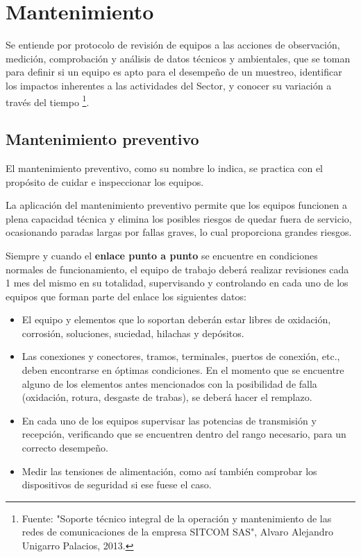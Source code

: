\documentclass[12pt,a4paper]{book}
\begin{document}
\section{Mantenimiento}
Se entiende por protocolo de revisión de equipos a las acciones de observación, medición, comprobación y análisis de datos técnicos y ambientales, que se toman para definir si un equipo es apto para el desempeño de un muestreo, identificar los impactos inherentes a las actividades del Sector, y conocer su variación a través del tiempo \footnote{\label{note1}Fuente: "Soporte técnico integral de la operación y mantenimiento de las redes de comunicaciones de la empresa SITCOM SAS", Alvaro Alejandro Unigarro Palacios, 2013.}.

\subsection{Mantenimiento preventivo}
El mantenimiento preventivo, como su nombre lo indica, se practica con el propósito de cuidar e inspeccionar los equipos. 

La aplicación del mantenimiento preventivo permite que los equipos funcionen a plena capacidad técnica y elimina los posibles riesgos de quedar fuera de servicio, ocasionando paradas largas por fallas graves, lo cual proporciona grandes riesgos.

Siempre y cuando el \textbf{enlace punto a punto} se encuentre en condiciones normales de funcionamiento, el equipo de trabajo deberá realizar revisiones cada 1 mes del mismo en su totalidad, supervisando y controlando en cada uno de los equipos que forman parte del enlace los siguientes datos:

\begin{itemize}
\item El equipo y elementos que lo soportan deberán estar libres de oxidación, corrosión, soluciones, suciedad, hilachas y depósitos.
\item Las conexiones y conectores, tramos, terminales, puertos de conexión, etc., deben encontrarse en óptimas condiciones. En el momento que se encuentre alguno de los elementos antes mencionados con la posibilidad de falla (oxidación, rotura, desgaste de trabas), se deberá hacer el remplazo.
\item En cada uno de los equipos supervisar las potencias de transmisión y recepción, verificando que se encuentren dentro del rango necesario, para un correcto desempeño.
\item Medir las tensiones de alimentación, como así también comprobar los dispositivos de seguridad si ese fuese el caso. 
\end{itemize}
\end{document}
